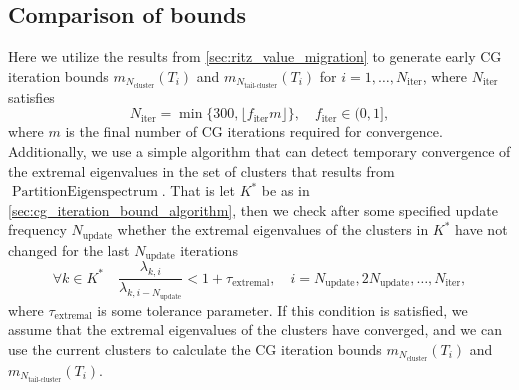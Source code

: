\subsection{Comparison of bounds}\label{sec:comparison_of_bounds}
Here we utilize the results from \cref{sec:ritz_value_migration} to generate early CG iteration bounds $m_{N_{\text{cluster}}}(T_i)$ and $m_{N_{\text{tail-cluster}}}(T_i)$ for $i=1,\ldots,N_{\text{iter}}$, where $N_{\text{iter}}$ satisfies
\[
    N_{\text{iter}} = \min\{300, \lfloor f_{\text{iter}} m \rfloor\}, \quad f_{\text{iter}} \in (0,1],
\]
where $m$ is the final number of CG iterations required for convergence. Additionally, we use a simple algorithm that can detect temporary convergence of the extremal eigenvalues in the set of clusters that results from $\operatorname{PartitionEigenspectrum}$. That is let $K^*$ be as in \cref{sec:cg_iteration_bound_algorithm}, then we check after some specified update frequency $N_{\text{update}}$ whether the extremal eigenvalues of the clusters in $K^*$ have not changed for the last $N_{\text{update}}$ iterations
\begin{equation}
    \forall k \in K^* \quad \frac{\lambda_{k, i}}{\lambda_{k, i-N_{\text{update}}}} < 1+\tau_{\text{extremal}}, \quad i = N_{\text{update}}, 2N_{\text{update}}, \ldots, N_{\text{iter}},
    \label{eq:extremal_eigenvalue_convergence_condition}
\end{equation}
where $\tau_{\text{extremal}}$ is some tolerance parameter. If this condition is satisfied, we assume that the extremal eigenvalues of the clusters have converged, and we can use the current clusters to calculate the CG iteration bounds $m_{N_{\text{cluster}}}(T_i)$ and $m_{N_{\text{tail-cluster}}}(T_i)$.

